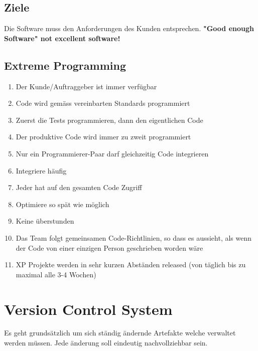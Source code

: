 \documentclass[10pt]{article}
\begin{document}
    \subsection{Ziele}
    Die Software muss den Anforderungen des Kunden entsprechen. \textbf{"Good enough Software" not excellent software!}

    \subsection{Extreme Programming}
    \begin{enumerate}
        \item Der Kunde/Auftraggeber ist immer verf\"ugbar
        \item Code wird gem\"ass vereinbarten Standards programmiert
        \item Zuerst die Tests programmieren, dann den eigentlichen Code
        \item Der produktive Code wird immer zu zweit programmiert
        \item Nur ein Programmierer-Paar darf gleichzeitig Code integrieren
        \item Integriere h\"aufig
        \item Jeder hat auf den gesamten Code Zugriff
        \item Optimiere so sp\"at wie m\"oglich
        \item Keine \"uberstunden
        \item Das Team folgt gemeinsamen Code-Richtlinien, so dass es aussieht, als wenn der Code von einer einzigen Person geschrieben worden w\"are
        \item XP Projekte werden in sehr kurzen Abst\"anden released (von t\"aglich bis zu maximal alle 3-4 Wochen)
    \end{enumerate}
	\newpage

    \section{Version Control System}
    Es geht grunds\"atzlich um sich st\"andig \"andernde Artefakte welche verwaltet werden m\"ussen. Jede \"anderung soll eindeutig nachvollziehbar sein.
\end{document}
